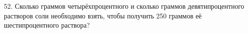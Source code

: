 52. Сколько граммов четырёхпроцентного и сколько граммов девятипроцентного растворов соли необходимо взять, чтобы получить 250 граммов её шестипроцентного раствора?\\
